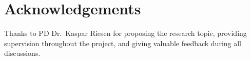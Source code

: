 \chapter*{Acknowledgements}

\begin{planned}
    \item Thanks to PD Dr.~Kaspar Riesen for proposing the research topic,
          providing supervision throughout the project, and giving valuable
          feedback during all discussions.
\end{planned}
